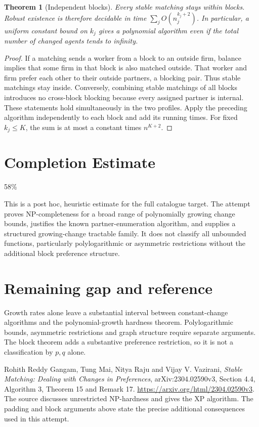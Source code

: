 \documentclass[11pt,a4paper]{article}
\newtheorem{theorem}{Theorem}[section]
\theoremstyle{definition}
\theoremstyle{remark}
\begin{document}
\begin{theorem}[Independent blocks]
Every stable matching stays within blocks. Robust existence is therefore decidable in time $\sum_j O(n_j^{k_j+2})$. In particular, a uniform constant bound on $k_j$ gives a polynomial algorithm even if the total number of changed agents tends to infinity.
\end{theorem}
\begin{proof}
If a matching sends a worker from a block to an outside firm, balance implies that some firm in that block is also matched outside. That worker and firm prefer each other to their outside partners, a blocking pair. Thus stable matchings stay inside. Conversely, combining stable matchings of all blocks introduces no cross-block blocking because every assigned partner is internal. These statements hold simultaneously in the two profiles. Apply the preceding algorithm independently to each block and add its running times. For fixed $k_j\leq K$, the sum is at most a constant times $n^{K+2}$.
\end{proof}

\section{Completion Estimate}
58\%

This is a post hoc, heuristic estimate for the full catalogue target.
The attempt proves NP-completeness for a broad range of polynomially growing change bounds, justifies the known partner-enumeration algorithm, and supplies a structured growing-change tractable family. It does not classify all unbounded functions, particularly polylogarithmic or asymmetric restrictions without the additional block preference structure.

\section{Remaining gap and reference}
Growth rates alone leave a substantial interval between constant-change algorithms and the polynomial-growth hardness theorem. Polylogarithmic bounds, asymmetric restrictions and graph structure require separate arguments. The block theorem adds a substantive preference restriction, so it is not a classification by $p,q$ alone.

Rohith Reddy Gangam, Tung Mai, Nitya Raju and Vijay V. Vazirani, \emph{Stable Matching: Dealing with Changes in Preferences}, arXiv:2304.02590v3, Section 4.4, Algorithm 3, Theorem 15 and Remark 17. \url{https://arxiv.org/html/2304.02590v3}. The source discusses unrestricted NP-hardness and gives the XP algorithm. The padding and block arguments above state the precise additional consequences used in this attempt.
\end{document}
